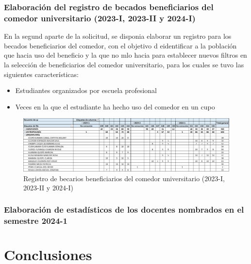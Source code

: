 \documentclass[
  12pt,
  letterpaper,
]{scrreprt}
\providecommand{\tightlist}{%
  \setlength{\itemsep}{0pt}\setlength{\parskip}{0pt}}\usepackage{longtable,booktabs,array}
\begin{document}
\subsection{Elaboración del registro de becados beneficiarios del
comedor universitario (2023-I, 2023-II y
2024-I)}\label{elaboraciuxf3n-del-registro-de-becados-beneficiarios-del-comedor-universitario-2023-i-2023-ii-y-2024-i}

En la segund aparte de la solicitud, se disponia elaborar un registro
para los becados beneficiarios del comedor, con el objetivo d
eidentificar a la población que hacia uso del beneficio y la que no mlo
hacia para establecer nuevos filtros en la selección de beneficiarios
del comedor universitario, para los cuales se tuvo las siguientes
características:

\begin{itemize}
\tightlist
\item
  Estudiantes organizados por escuela profesional
\item
  Veces en la que el estudiante ha hecho uso del comedor en un cupo
\end{itemize}

\begin{figure}[H]

\caption{Registro de becarios beneficiarios del comedor universitario
(2023-I, 2023-II y 2024-I)}

{\centering \includegraphics{imagen/cuadro2.png}

}

\end{figure}%

\subsection{Elaboración de estadísticos de los docentes nombrados en el
semestre
2024-1}\label{elaboraciuxf3n-de-estaduxedsticos-de-los-docentes-nombrados-en-el-semestre-2024-1}


\chapter{Conclusiones}\label{conclusiones}
\end{document}
